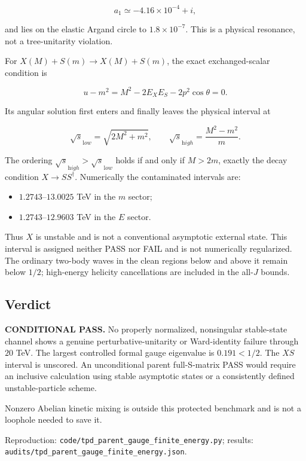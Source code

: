 \documentclass[
]{article}
\providecommand{\tightlist}{%
  \setlength{\itemsep}{0pt}\setlength{\parskip}{0pt}}
\begin{document}
\[
a_1\simeq-4.16\times10^{-4}+i,
\]

and lies on the elastic Argand circle to \(1.8\times10^{-7}\). This is a
physical resonance, not a tree-unitarity violation.

For \(X(M)+S(m)\to X(M)+S(m)\), the exact exchanged-scalar condition is

\[
u-m^2=M^2-2E_XE_S-2p^2\cos\theta=0.
\]

Its angular solution first enters and finally leaves the physical
interval at

\[
\sqrt{s}_{\mathrm low}=\sqrt{2M^2+m^2},\qquad
\sqrt{s}_{\mathrm high}=\frac{M^2-m^2}{m}.
\]

The ordering \(\sqrt{s}_{\mathrm high}>\sqrt{s}_{\mathrm low}\) holds if
and only if \(M>2m\), exactly the decay condition \(X\to SS^\dagger\).
Numerically the contaminated intervals are:

\begin{itemize}
\tightlist
\item
  \(1.2743\)--\(13.0025\) TeV in the \(m\) sector;
\item
  \(1.2743\)--\(12.9603\) TeV in the \(E\) sector.
\end{itemize}

Thus \(X\) is unstable and is not a conventional asymptotic external
state. This interval is assigned neither PASS nor FAIL and is not
numerically regularized. The ordinary two-body waves in the clean
regions below and above it remain below \(1/2\); high-energy helicity
cancellations are included in the all-\(J\) bounds.

\hypertarget{verdict}{%
\subsection{Verdict}\label{verdict}}

\textbf{CONDITIONAL PASS.} No properly normalized, nonsingular
stable-state channel shows a genuine perturbative-unitarity or
Ward-identity failure through \(20\) TeV. The largest controlled formal
gauge eigenvalue is \(0.191<1/2\). The \(XS\) interval is unscored. An
unconditional parent full-S-matrix PASS would require an inclusive
calculation using stable asymptotic states or a consistently defined
unstable-particle scheme.

Nonzero Abelian kinetic mixing is outside this protected benchmark and
is not a loophole needed to save it.

Reproduction: \texttt{code/tpd\_parent\_gauge\_finite\_energy.py};
results: \texttt{audits/tpd\_parent\_gauge\_finite\_energy.json}.
\end{document}
